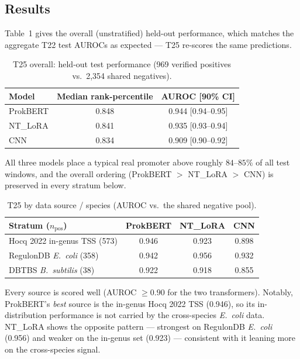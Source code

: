 \documentclass{article}
\begin{document}
\subsection{Results}
Table~1 gives the overall (unstratified) held-out performance, which matches the aggregate T22 test AUROCs as expected --- T25 re-scores the same predictions.

\begin{table}[h]
\centering
\caption{T25 overall: held-out test performance (969 verified positives vs.\ 2{,}354 shared negatives).}
\begin{tabular}{lcc}
\toprule
Model & Median rank-percentile & AUROC [90\% CI] \\
\midrule
ProkBERT & 0.848 & 0.944 [0.94--0.95] \\
NT\_LoRA  & 0.841 & 0.935 [0.93--0.94] \\
CNN      & 0.834 & 0.909 [0.90--0.92] \\
\bottomrule
\end{tabular}
\end{table}

All three models place a typical real promoter above roughly $84$--$85\%$ of all test windows, and the overall ordering (ProkBERT $>$ NT\_LoRA $>$ CNN) is preserved in every stratum below.

\begin{table}[h]
\centering
\caption{T25 by data source / species (AUROC vs.\ the shared negative pool).}
\begin{tabular}{lccc}
\toprule
Stratum ($n_{\text{pos}}$) & ProkBERT & NT\_LoRA & CNN \\
\midrule
Hocq 2022 in-genus TSS (573)   & 0.946 & 0.923 & 0.898 \\
RegulonDB \emph{E.\ coli} (358) & 0.942 & 0.956 & 0.932 \\
DBTBS \emph{B.\ subtilis} (38) & 0.922 & 0.918 & 0.855 \\
\bottomrule
\end{tabular}
\end{table}

Every source is scored well (AUROC $\ge 0.90$ for the two transformers). Notably, ProkBERT's \emph{best} source is the in-genus Hocq 2022 TSS (0.946), so its in-distribution performance is not carried by the cross-species \emph{E.\ coli} data. NT\_LoRA shows the opposite pattern --- strongest on RegulonDB \emph{E.\ coli} (0.956) and weaker on the in-genus set (0.923) --- consistent with it leaning more on the cross-species signal.
\end{document}
